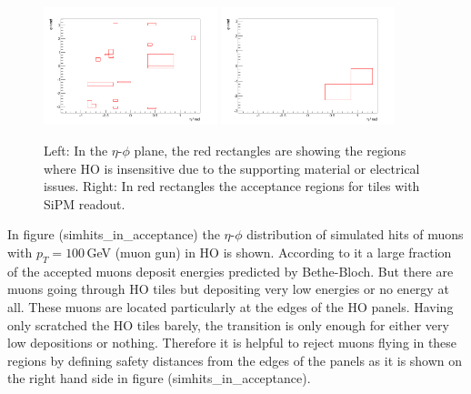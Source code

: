 			\begin{figure}[htbp]
				\centering
				\includegraphics[width=0.45\textwidth]{Figures/erdogan/deadregions.png}
				\includegraphics[width=0.45\textwidth]{Figures/erdogan/sipmregions.png}
				\caption{Left: In the $\eta$-$\phi$ plane, the red rectangles are showing the regions where HO is insensitive due to the supporting material or electrical issues. Right: In red rectangles the
				acceptance regions for tiles with SiPM readout.}
				\label{fig:ho_acceptance}
			\end{figure}
			In figure (simhits_in_acceptance) the $\eta$-$\phi$ distribution of simulated hits of muons with $p_T = 100$\,GeV (muon gun) in HO is shown.
			According to it a large fraction of the accepted muons deposit energies predicted by Bethe-Bloch.
			But there are muons going through HO tiles but depositing very low energies or no energy at all.
			These muons are located particularly at the edges of the HO panels.
			Having only scratched the HO tiles barely, the transition is only enough for either very low depositions or nothing.
			Therefore it is helpful to reject muons flying in these regions by defining safety distances from the edges of the panels as it is shown on the right hand side in figure (simhits_in_acceptance).
